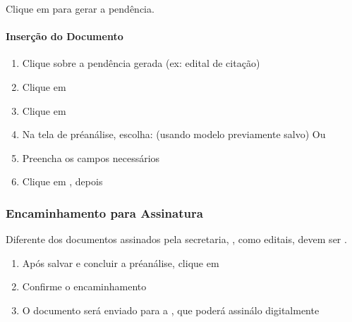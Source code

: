 \documentclass[letterpaper,10pt,brazil]{sphinxmanual}
\begin{document}
\sphinxAtStartPar
Clique em  para gerar a pendência.


\paragraph{Inserção do Documento}
\label{\detokenize{projud_33_ordenarcumprimento:insercao-do-documento}}\begin{enumerate}
%
\item {} 
\sphinxAtStartPar
Clique sobre a pendência gerada (ex: edital de citação)

\item {} 
\sphinxAtStartPar
Clique em 

\item {} 
\sphinxAtStartPar
Clique em 

\item {} 
\sphinxAtStartPar
Na tela de pré\sphinxhyphen{}análise, escolha:
\sphinxhyphen{}  (usando modelo previamente salvo)
\sphinxhyphen{} Ou 

\item {} 
\sphinxAtStartPar
Preencha os campos necessários

\item {} 
\sphinxAtStartPar
Clique em , depois 

\end{enumerate}


\subsubsection{Encaminhamento para Assinatura}
\label{\detokenize{projud_33_ordenarcumprimento:encaminhamento-para-assinatura}}
\sphinxAtStartPar
Diferente dos documentos assinados pela secretaria, , como editais, devem ser .
\begin{enumerate}
%
\item {} 
\sphinxAtStartPar
Após salvar e concluir a pré\sphinxhyphen{}análise, clique em 

\item {} 
\sphinxAtStartPar
Confirme o encaminhamento

\item {} 
\sphinxAtStartPar
O documento será enviado para a , que poderá assiná\sphinxhyphen{}lo digitalmente

\end{enumerate}
\end{document}
